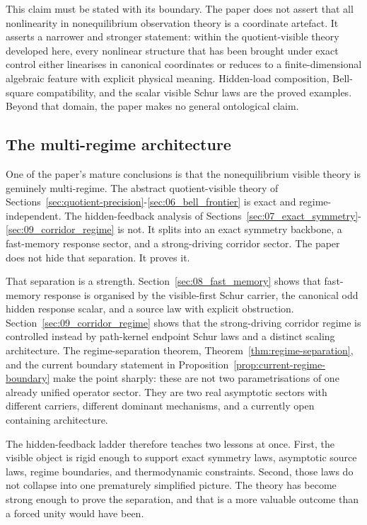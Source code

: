 \documentclass[11pt]{article}
\numberwithin{equation}{section}
\theoremstyle{thmcompact}
\theoremstyle{remark}
\begin{document}
This claim must be stated with its boundary. The paper does not assert that all nonlinearity in nonequilibrium observation theory is a coordinate artefact. It asserts a narrower and stronger statement: within the quotient-visible theory developed here, every nonlinear structure that has been brought under exact control either linearises in canonical coordinates or reduces to a finite-dimensional algebraic feature with explicit physical meaning. Hidden-load composition, Bell-square compatibility, and the scalar visible Schur laws are the proved examples. Beyond that domain, the paper makes no general ontological claim.

\subsection{The multi-regime architecture}

One of the paper's mature conclusions is that the nonequilibrium visible theory is genuinely multi-regime. The abstract quotient-visible theory of Sections~\ref{sec:quotient-precision}-\ref{sec:06_bell_frontier} is exact and regime-independent. The hidden-feedback analysis of Sections~\ref{sec:07_exact_symmetry}-\ref{sec:09_corridor_regime} is not. It splits into an exact symmetry backbone, a fast-memory response sector, and a strong-driving corridor sector. The paper does not hide that separation. It proves it.

That separation is a strength. Section~\ref{sec:08_fast_memory} shows that fast-memory response is organised by the visible-first Schur carrier, the canonical odd hidden response scalar, and a source law with explicit obstruction. Section~\ref{sec:09_corridor_regime} shows that the strong-driving corridor regime is controlled instead by path-kernel endpoint Schur laws and a distinct scaling architecture. The regime-separation theorem, Theorem~\ref{thm:regime-separation}, and the current boundary statement in Proposition~\ref{prop:current-regime-boundary} make the point sharply: these are not two parametrisations of one already unified operator sector. They are two real asymptotic sectors with different carriers, different dominant mechanisms, and a currently open containing architecture.

The hidden-feedback ladder therefore teaches two lessons at once. First, the visible object is rigid enough to support exact symmetry laws, asymptotic source laws, regime boundaries, and thermodynamic constraints. Second, those laws do not collapse into one prematurely simplified picture. The theory has become strong enough to prove the separation, and that is a more valuable outcome than a forced unity would have been.
\end{document}
